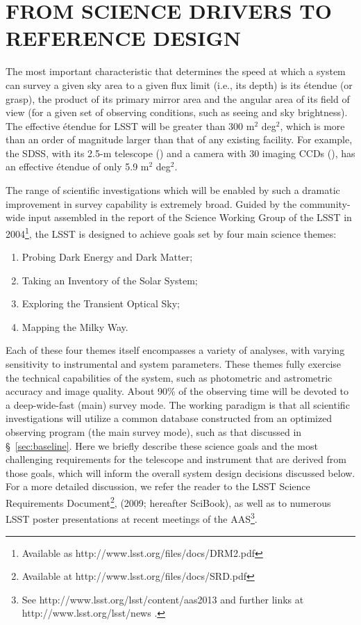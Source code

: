 \section{  FROM SCIENCE DRIVERS TO REFERENCE DESIGN}
\label{Sec:refdesign}

The most important characteristic that determines the speed at which a system can
survey a given sky area to a given flux limit (i.e., its depth) is its \'etendue
(or grasp), the product of its primary mirror area and the angular
area of its field of view (for a given set of observing conditions, such as
seeing and sky brightness).
The effective \'etendue for LSST will be greater than 300 m$^2$ deg$^2$, which
is more than an order of magnitude larger than that of any existing facility.
For example, the SDSS, with its 2.5-m telescope (\cite{Gunn2006}) and a
camera with 30 imaging CCDs (\cite{Gunn1998}), has an effective \'etendue of
only 5.9 m$^2$ deg$^2$.

The range of scientific investigations which will be enabled by such a
dramatic improvement in survey capability is extremely broad. Guided by
the community-wide input assembled in the report of the Science Working Group of the
LSST in 2004\footnote{Available as
http://www.lsst.org/files/docs/DRM2.pdf}, the LSST is designed to
achieve goals set by four main science themes:

\begin{enumerate}
\item Probing Dark Energy and Dark Matter;
\item Taking an Inventory of the Solar System;
\item Exploring the Transient Optical Sky;
\item Mapping the Milky Way.
\end{enumerate}

Each of these four themes itself encompasses a variety of analyses, with
varying sensitivity to instrumental and system parameters. These themes
fully exercise the technical capabilities of the system, such as photometric
and astrometric accuracy and image quality. About 90\% of the observing time
will be devoted to a deep-wide-fast (main) survey mode. The working paradigm is that all
scientific investigations will utilize a common database constructed from an optimized
observing program (the main survey mode), such as that discussed in
\S~\ref{sec:baseline}.
Here we briefly describe these science goals and the most challenging requirements for the
telescope and instrument that are derived from those goals, which will
inform the overall system design decisions discussed below.
For a more detailed discussion, we refer the reader to the LSST Science Requirements
Document\footnote{Available at
http://www.lsst.org/files/docs/SRD.pdf},
(2009; hereafter SciBook),
as well as to numerous LSST poster presentations at recent
meetings of the AAS\footnote{See
http://www.lsst.org/lsst/content/aas2013 and further links at
http://www.lsst.org/lsst/news .}.


